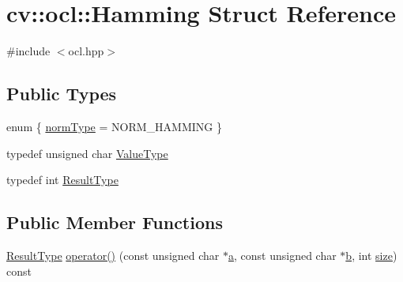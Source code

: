 \hypertarget{structcv_1_1ocl_1_1Hamming}{\section{cv\-:\-:ocl\-:\-:Hamming Struct Reference}
\label{structcv_1_1ocl_1_1Hamming}
}


{\ttfamily \#include $<$ocl.\-hpp$>$}

\subsection*{Public Types}
\begin{DoxyCompactItemize}
\item 
enum \{ \hyperlink{structcv_1_1ocl_1_1Hamming_a71fe89e46efcfdaa1f7f2e1650cdf422ad77feba5d76d67db671e6d229aadaa2a}{norm\-Type} = N\-O\-R\-M\-\_\-\-H\-A\-M\-M\-I\-N\-G
 \}
\item 
typedef unsigned char \hyperlink{structcv_1_1ocl_1_1Hamming_aa130804c2706b7f6b6d6dbfb80ab42af}{Value\-Type}
\item 
typedef int \hyperlink{structcv_1_1ocl_1_1Hamming_aff9c33cfa8fbfc780580008bf7809b03}{Result\-Type}
\end{DoxyCompactItemize}
\subsection*{Public Member Functions}
\begin{DoxyCompactItemize}
\item 
\hyperlink{structcv_1_1ocl_1_1Hamming_aff9c33cfa8fbfc780580008bf7809b03}{Result\-Type} \hyperlink{structcv_1_1ocl_1_1Hamming_a19e8134e422ad40f8b56ba89d962c76f}{operator()} (const unsigned char $\ast$\hyperlink{legacy_8hpp_a1031d0e0a97a340abfe0a6ab9e831045}{a}, const unsigned char $\ast$\hyperlink{legacy_8hpp_ac04272e8ca865b8fba18d36edae9fd2a}{b}, int \hyperlink{legacy_8hpp_ae97003f8d5c64cdfb99f6f2606d121b6}{size}) const 
\end{DoxyCompactItemize}


